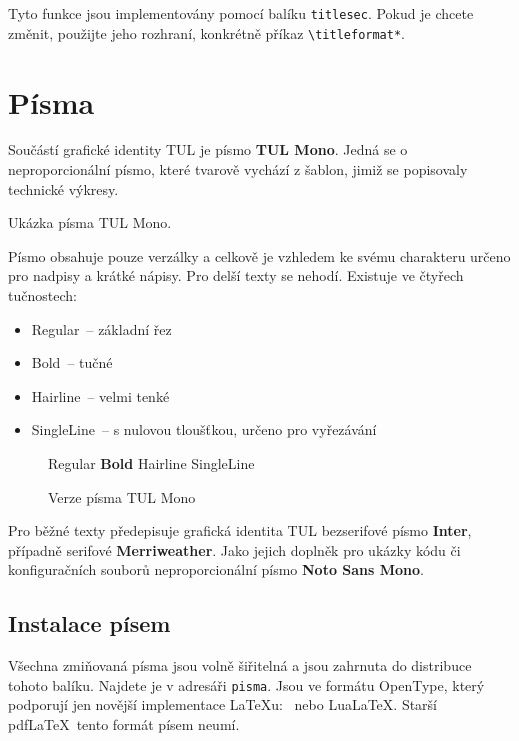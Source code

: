 \documentclass[a4paper,12pt,twoside]{article}
\newcommand{\cmdfont}[1]{\texttt{\color{\tulcolor}#1}}
\newcommand{\cmdnoindex}[1]{\cmdfont{\textbackslash #1}}
\begin{document}
Tyto funkce jsou implementovány pomocí balíku \cmdfont{titlesec}. Pokud je
chcete změnit, použijte jeho rozhraní, konkrétně příkaz
\cmdnoindex{titleformat*}.


\section{Písma}\label{pisma}

Součástí grafické identity TUL je písmo \textbf{TUL Mono}. Jedná se o
neproporcionální písmo, které tvarově vychází z šablon, jimiž se
popisovaly technické výkresy.

{\TULmono Ukázka písma TUL Mono.}

Písmo obsahuje pouze verzálky a celkově je vzhledem ke svému charakteru určeno
pro nadpisy a krátké nápisy. Pro delší texty se nehodí. Existuje ve čtyřech
tučnostech:

\begin{itemize}\setlength{\itemsep}{0pt}
\item Regular~-- základní řez
\item Bold~-- tučné
\item Hairline~-- velmi tenké
\item SingleLine~-- s nulovou tloušťkou, určeno pro vyřezávání
\end{itemize}

\begin{figure}[htp]
\begin{center}
{\TULmono Regular \textbf{Bold} Hairline
SingleLine}\\
\end{center}
\caption{Verze písma TUL Mono}
\label{tul-mono}
\end{figure}

Pro běžné texty předepisuje grafická identita TUL bezserifové písmo
\textbf{Inter}, případně serifové \textbf{Merriweather}. Jako jejich doplněk
pro ukázky kódu či konfiguračních souborů neproporcionální písmo \textbf{Noto
Sans Mono}.


\subsection{Instalace písem}

Všechna zmiňovaná písma jsou volně šiřitelná a jsou zahrnuta do distribuce
tohoto balíku. Najdete je v adresáři \cmdfont{pisma}. Jsou ve formátu OpenType,
který podporují jen novější implementace \LaTeX u: \XeLaTeX\ nebo Lua\LaTeX.
Starší pdf\LaTeX\ tento formát písem neumí.
\end{document}

